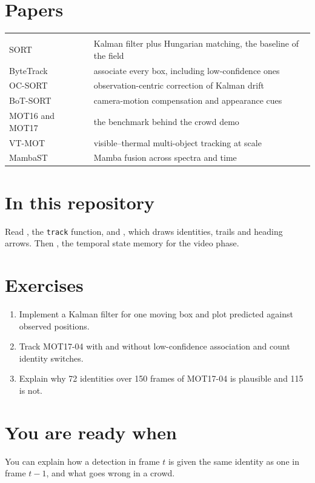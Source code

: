 \section{Papers}

\begin{tabularx}{\textwidth}{@{}P{5.2cm}L@{}}
 &  \\
SORT~\cite{bewley2016sort} & Kalman filter plus Hungarian matching, the baseline of the field \\
ByteTrack~\cite{zhang2022bytetrack} & associate every box, including low-confidence ones \\
OC-SORT~\cite{cao2023ocsort} & observation-centric correction of Kalman drift \\
BoT-SORT~\cite{aharon2022botsort} & camera-motion compensation and appearance cues \\
MOT16 and MOT17~\cite{milan2016mot16} & the benchmark behind the crowd demo \\
VT-MOT~\cite{vtmot2024} & visible--thermal multi-object tracking at scale \\
MambaST~\cite{mambast2024} & Mamba fusion across spectra and time \\
\end{tabularx}

\section{In this repository}

Read , the \texttt{track} function, and , which draws
identities, trails and heading arrows. Then , the temporal state memory for the video phase.

\section{Exercises}

\begin{enumerate}
  \item Implement a Kalman filter for one moving box and plot predicted against observed positions.
  \item Track MOT17-04 with and without low-confidence association and count identity switches.
  \item Explain why 72 identities over 150 frames of MOT17-04 is plausible and 115 is not.
\end{enumerate}

\section{You are ready when}

You can explain how a detection in frame $t$ is given the same identity as one in frame $t-1$, and what goes
wrong in a crowd.
